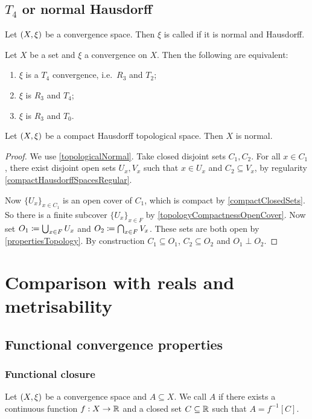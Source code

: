\subsection{$T_4$ or normal Hausdorff}
\begin{definition}
Let $\sSet{X,\xi}$ be a convergence space. Then $\xi$ is called  if it is normal and Hausdorff.
\end{definition}

\begin{proposition}
Let $X$ be a set and $\xi$ a convergence on $X$. Then the following are equivalent:
\begin{enumerate}
\item $\xi$ is a $T_4$ convergence, i.e.\ $R_3$ and $T_2$;
\item $\xi$ is $R_3$ and $T_4$;
\item $\xi$ is $R_3$ and $T_0$.
\end{enumerate}
\end{proposition}


\begin{proposition} \label{compactHausdorffSpacesNormal}
Let $\sSet{X,\xi}$ be a compact Hausdorff topological space. Then $X$ is normal.
\end{proposition}
\begin{proof}
We use \ref{topologicalNormal}. Take closed disjoint sets $C_1,C_2$. For all $x\in C_1$, there exist disjoint open sets $U_x, V_x$ such that $x\in U_x$ and $C_2\subseteq V_x$, by regularity \ref{compactHausdorffSpacesRegular}.

Now $\{U_x\}_{x\in C_1}$ is an open cover of $C_1$, which is compact by \ref{compactClosedSets}. So there is a finite subcover $\{U_x\}_{x\in F}$ by \ref{topologyCompactnessOpenCover}. Now set $O_1 \coloneqq \bigcup_{x\in F} U_x$ and $O_2 \coloneqq \bigcap_{x\in F} V_x$. These sets are both open by \ref{propertiesTopology}. By construction $C_1\subseteq O_1$, $C_2\subseteq O_2$ and $O_1\perp O_2$.
\end{proof}

\section{Comparison with reals and metrisability}
\subsection{Functional convergence properties}
\subsubsection{Functional closure}
\begin{definition}
Let $\sSet{X,\xi}$ be a convergence space and $A\subseteq X$. We call $A$  if there exists a continuous function $f: X\to \mathbb{R}$ and a closed set $C\subseteq \mathbb{R}$ such that $A = f^{-1}[C]$.
\end{definition}

